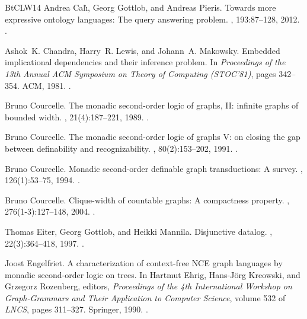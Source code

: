 \documentclass[10pt,a4paper]{amsart}
\theoremstyle{definition}
\numberwithin{equation}{section}
\theoremstyle{plain}
\theoremstyle{definition}
\theoremstyle{myexample}
\theoremstyle{plain}
\theoremstyle{definition}
\begin{document}
\begin{thebibliography}{BtCLW14}
Andrea Cal{\`{\i}}, Georg Gottlob, and Andreas Pieris.
\newblock Towards more expressive ontology languages: {T}he query answering
  problem.
, 193:87--128, 2012.
\newblock \href {https://doi.org/10.1016/j.artint.2012.08.002}
  {}.

Ashok~K. Chandra, Harry~R. Lewis, and Johann~A. Makowsky.
\newblock Embedded implicational dependencies and their inference problem.
\newblock In {\em Proceedings of the 13th Annual {ACM} Symposium on Theory of
  Computing (STOC'81)}, pages 342--354. {ACM}, 1981.
\newblock \href {https://doi.org/10.1145/800076.802488}
  {}.

Bruno Courcelle.
\newblock The monadic second-order logic of graphs, {II:} infinite graphs of
  bounded width.
, 21(4):187--221, 1989.
\newblock \href {https://doi.org/10.1007/BF02088013}
  {}.

Bruno Courcelle.
\newblock The monadic second-order logic of graphs {V:} on closing the gap
  between definability and recognizability.
, 80(2):153--202, 1991.
\newblock \href {https://doi.org/10.1016/0304-3975(91)90387-H}
  {}.

Bruno Courcelle.
\newblock Monadic second-order definable graph transductions: {A} survey.
, 126(1):53--75, 1994.
\newblock \href {https://doi.org/10.1016/0304-3975(94)90268-2}
  {}.

Bruno Courcelle.
\newblock Clique-width of countable graphs: {A} compactness property.
, 276(1-3):127--148, 2004.
\newblock \href {https://doi.org/10.1016/S0012-365X(03)00303-0}
  {}.

Thomas Eiter, Georg Gottlob, and Heikki Mannila.
\newblock Disjunctive datalog.
, 22(3):364--418, 1997.
\newblock \href {https://doi.org/10.1145/261124.261126}
  {}.

Joost Engelfriet.
\newblock A characterization of context-free {NCE} graph languages by monadic
  second-order logic on trees.
\newblock In Hartmut Ehrig, Hans{-}J{\"{o}}rg Kreowski, and Grzegorz Rozenberg,
  editors, {\em Proceedings of the 4th International Workshop on Graph-Grammars
  and Their Application to Computer Science}, volume 532 of {\em LNCS}, pages
  311--327. Springer, 1990.
\newblock \href {https://doi.org/10.1007/BFb0017397}
  {}.


\end{thebibliography}
\end{document}

